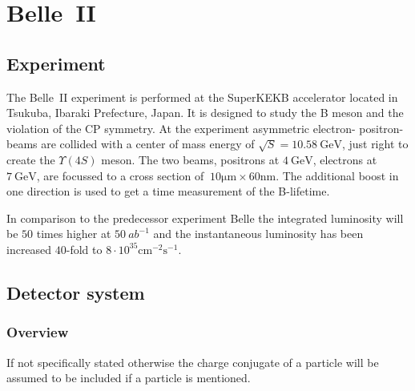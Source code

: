 \chapter{Belle~\RN{2}}
\label{chap:belle2_experiment}

\section{Experiment}
\label{sec:experimental}

The Belle~\RN{2} experiment is performed at the SuperKEKB accelerator located in Tsukuba, Ibaraki Prefecture, Japan. It is designed to study the B meson and the violation of the CP symmetry.
At the experiment asymmetric electron- positron-beams are collided with a center of mass energy of $\sqrt{S} = 10.58 \mathrm{~GeV}$, just right to create the $\Upsilon (4S)$ meson. The two beams, positrons at $4 \mathrm{~GeV}$, electrons at $7 \mathrm{~GeV}$, are focussed to a cross section of $~10 \mathrm{\mu m} \times 60 \mathrm{nm}$. The additional boost in one direction is used to get a time measurement of the B-lifetime. %

In comparison to the predecessor experiment Belle the integrated luminosity will be $50$ times higher at $50~{ab}^{-1}$ and the instantaneous luminosity has been increased $40$-fold to $8 \cdot 10^{35} \mathrm{cm}^{-2} \mathrm{s}^{-1}$.

\section{Detector system}
\label{sec:detector_system}

\subsection{Overview}
\label{subsec:detector_system_overview}

If not specifically stated otherwise the charge conjugate of a particle will be assumed to be included if a particle is mentioned.

